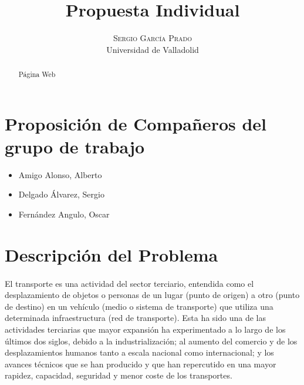 \documentclass[10pt, a4paper,spanish]{article}
\title{\vspace{-15mm}\fontsize{24pt}{10pt}\selectfont\textbf{Propuesta Individual}} %
\author{
\large
\textsc{Sergio García Prado}\\[2mm] %
\normalsize Universidad de Valladolid \\ %
\vspace{-5mm}
}
\date{}
\begin{document}
	\maketitle %

	\thispagestyle{fancy} %


	\begin{abstract}
		\noindent Página Web 
	\end{abstract}
	

		\section{Proposición de Compañeros del grupo de trabajo}
			
			\begin{center}
				\begin{varwidth}{\textwidth}
					\begin{itemize}
						\item Amigo Alonso, Alberto
						\item Delgado Álvarez, Sergio
						\item Fernández Angulo, Oscar
					\end{itemize}
				\end{varwidth}
			\end{center}
			
		\section{Descripción del Problema}
		
			\paragraph{}
			El transporte es una actividad del sector terciario, entendida como el desplazamiento de objetos o personas de un lugar (punto de origen) a otro (punto de destino) en un vehículo (medio o sistema de transporte) que utiliza una determinada infraestructura (red de transporte). Esta ha sido una de las actividades terciarias que mayor expansión ha experimentado a lo largo de los últimos dos siglos, debido a la industrialización; al aumento del comercio y de los desplazamientos humanos tanto a escala nacional como internacional; y los avances técnicos que se han producido y que han repercutido en una mayor rapidez, capacidad, seguridad y menor coste de los transportes. \cite{wikipedia_transporte}
			
\end{document}
